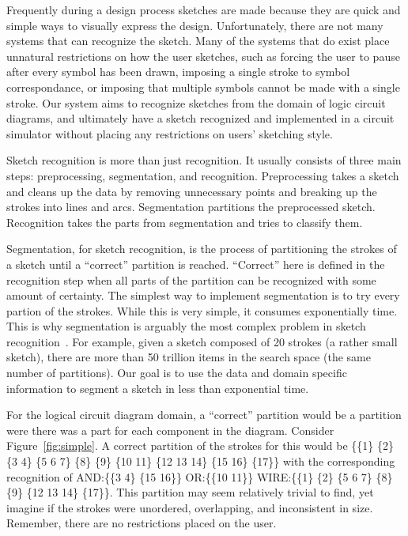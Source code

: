 \documentclass[10pt]{acmsiggraph}               %
\begin{document}

Frequently during a design process sketches are made because they are quick and simple ways to visually express the design.
Unfortunately, there are not many systems that can recognize the sketch.
Many of the systems that do exist place unnatural restrictions on how the user sketches, such as forcing the user to pause after every symbol has been drawn, imposing a single stroke to symbol correspondance, or imposing that multiple symbols cannot be made with a single stroke.
Our system aims to recognize sketches from the domain of logic circuit diagrams, and ultimately have a sketch recognized and implemented in a circuit simulator without placing any restrictions on users' sketching style.

Sketch recognition is more than just recognition.
It usually consists of three main steps: preprocessing, segmentation, and recognition.
Preprocessing takes a sketch and cleans up the data by removing unnecessary points and breaking up the strokes into lines and arcs.
Segmentation partitions the preprocessed sketch.
Recognition takes the parts from segmentation and tries to classify them.

Segmentation, for sketch recognition, is the process of partitioning the strokes of a sketch until a ``correct'' partition is reached.
``Correct'' here is defined in the recognition step when all parts of the partition can be recognized with some amount of certainty.
The simplest way to implement segmentation is to try every partion of the strokes.
While this is very simple, it consumes exponentially time. 
This is why segmentation is arguably the most complex problem in sketch recognition~\cite{pattern}.
For example, given a sketch composed of 20 strokes (a rather small sketch), there are more than 50 trillion items in the search space (the same number of partitions).
Our goal is to use the data and domain specific information to segment a sketch in less than exponential time. 

For the logical circuit diagram domain, a ``correct'' partition would be a partition were there was a part for each component in the diagram.
Consider Figure~\ref{fig:simple}. 
A correct partition of the strokes for this would be \{\{1\} \{2\} \{3 4\} \{5 6 7\} \{8\} \{9\} \{10 11\} \{12 13 14\} \{15 16\} \{17\}\} with the corresponding recognition of AND:\{\{3 4\} \{15 16\}\} OR:\{\{10 11\}\} WIRE:\{\{1\} \{2\} \{5 6 7\} \{8\} \{9\} \{12 13 14\} \{17\}\}. 
This partition may seem relatively trivial to find, yet imagine if the strokes were unordered, overlapping, and inconsistent in size.
Remember, there are no restrictions placed on the user.
\end{document}
